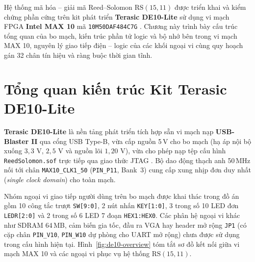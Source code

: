 \documentclass[11pt,a4paper]{report}
\begin{document}
Hệ thống mã hóa -- giải mã Reed--Solomon $\text{RS}(15,11)$ được triển khai và kiểm chứng phần cứng trên kit phát triển \textbf{Terasic DE10-Lite} sử dụng vi mạch FPGA \textbf{Intel MAX 10} mã \texttt{10M50DAF484C7G} \cite{de10lite}. Chương này trình bày cấu trúc tổng quan của bo mạch, kiến trúc phần tử logic và bộ nhớ bên trong vi mạch MAX 10, nguyên lý giao tiếp điện -- logic của các khối ngoại vi cùng quy hoạch gán 32 chân tín hiệu và ràng buộc thời gian tĩnh.

\section{Tổng quan kiến trúc Kit Terasic DE10-Lite}
\label{sec:de10-overview}

\textbf{Terasic DE10-Lite} là nền tảng phát triển tích hợp sẵn vi mạch nạp \textbf{USB-Blaster II} qua cổng USB Type-B, vừa cấp nguồn 5\,V cho bo mạch (hạ áp nội bộ xuống $3{,}3\text{ V}$, $2{,}5\text{ V}$ và nguồn lõi $1{,}20\text{ V}$), vừa cho phép nạp tệp cấu hình \texttt{ReedSolomon.sof} trực tiếp qua giao thức JTAG \cite{de10lite}. Bộ dao động thạch anh 50\,MHz nối tới chân \texttt{MAX10\_CLK1\_50} (\texttt{PIN\_P11}, Bank~3) cung cấp xung nhịp đơn duy nhất (\textit{single clock domain}) cho toàn mạch.

Nhóm ngoại vi giao tiếp người dùng trên bo mạch được khai thác trong đồ án gồm 10 công tắc trượt \texttt{SW[9:0]}, 2 nút nhấn \texttt{KEY[1:0]}, 3 trong số 10 LED đơn \texttt{LEDR[2:0]} và 2 trong số 6 LED 7 đoạn \texttt{HEX1:HEX0}. Các phân hệ ngoại vi khác như SDRAM 64\,MB, cảm biến gia tốc, đầu ra VGA hay header mở rộng \texttt{JP1} (có cặp chân \texttt{PIN\_V10}, \texttt{PIN\_W10} dự phòng cho UART mở rộng) chưa được sử dụng trong cấu hình hiện tại. Hình~\ref{fig:de10-overview} tóm tắt sơ đồ kết nối giữa vi mạch MAX 10 và các ngoại vi phục vụ hệ thống $\text{RS}(15,11)$.
\end{document}
